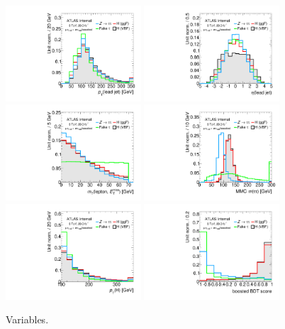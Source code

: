 \begin{figure}[tp]
  \centering
  \includegraphics[width=0.45\textwidth]{figures/overlaid/boost/jet-1-pt}
  \includegraphics[width=0.45\textwidth]{figures/overlaid/boost/jet-1-eta}
  \includegraphics[width=0.45\textwidth]{figures/overlaid/boost/mT}
  \includegraphics[width=0.45\textwidth]{figures/overlaid/boost/mMMC}
  \includegraphics[width=0.45\textwidth]{figures/overlaid/boost/H-pt-hi}
  \includegraphics[width=0.45\textwidth]{figures/overlaid/boost/BDTEve-boost}
  \caption{Variables.}
  \label{fig:strategy-overlaid-boost-other}
\end{figure}
